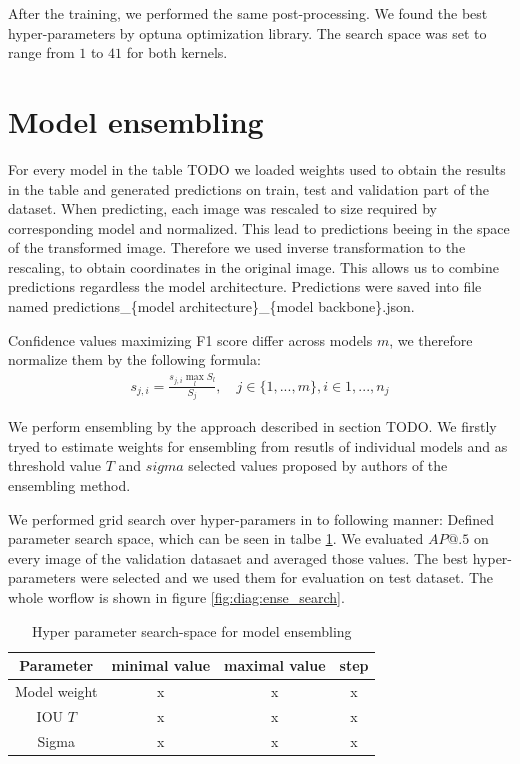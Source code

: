 After the training, we performed the same post-processing. We found the best hyper-parameters by optuna optimization library. The search space was set to range from $1$ to $41$ for both kernels.




\section{Model ensembling}

For every model in the table TODO we loaded weights used to obtain the results in the table and generated predictions on train, test and validation part of the dataset. When predicting, each image was rescaled to size required by corresponding model and normalized. This lead to predictions beeing in the space of the transformed image. Therefore we used inverse transformation to the rescaling, to obtain coordinates in the original image. This allows us to combine predictions regardless the model architecture.
Predictions were saved into file named predictions\_\{model architecture\}\_\{model backbone\}.json.

Confidence values maximizing F1 score differ across models $m$, we therefore normalize them by the following formula:
\begin{align}
    s_{j,i} = \frac{s_{j,i} \max_l S_l}{  S_j}, \quad j \in \{ 1,...,m\}, i \in {1,...,n_j}
\end{align}

We perform ensembling by the approach described in section TODO. We firstly tryed to estimate weights for ensembling from resutls of individual models and as threshold value $T$ and $sigma$ selected values proposed by authors of the ensembling method.

We performed grid search over hyper-paramers in to following manner: Defined parameter search space, which can be seen in talbe \ref{tab:ensembling_search_space}. We evaluated $AP@.5$ on every image of the validation datasaet and averaged those values. The best hyper-parameters were selected and we used them for evaluation on test dataset. The whole worflow is shown in figure \ref{fig:diag:ense_search}.

\begin{table}
    \centering
    \begin{tabular}{|c|c|c|c|}
        Parameter                                         & minimal value & maximal value & step \\ \hline
        Model weight                                      & x             & x             & x    \\ \hline
        IOU $T$                                           & x             & x             & x    \\ \hline
        Sigma & x             & x             & x    \\ \hline
    \end{tabular}
    \caption{Hyper parameter search-space for model ensembling}
    \label{tab:ensembling_search_space}
\end{table}

